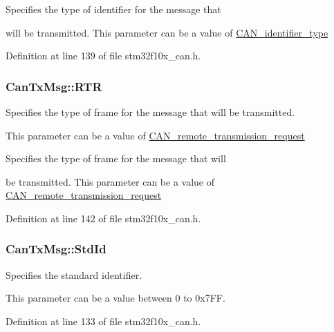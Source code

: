 \begin{DoxyVerb}     Specifies the type of identifier for the message that 
\end{DoxyVerb}
 will be transmitted. This parameter can be a value of \hyperlink{group___c_a_n__identifier__type}{C\-A\-N\-\_\-identifier\-\_\-type} 

Definition at line 139 of file stm32f10x\-\_\-can.\-h.

\hypertarget{struct_can_tx_msg_a69f84255db38c6910058f290efdb7302}{
\subsubsection[{R\-T\-R}]{ Can\-Tx\-Msg\-::\-R\-T\-R}}\label{struct_can_tx_msg_a69f84255db38c6910058f290efdb7302}
\begin{DoxyVerb}     Specifies the type of frame for the message that will be transmitted.
\end{DoxyVerb}
 This parameter can be a value of \hyperlink{group___c_a_n__remote__transmission__request}{C\-A\-N\-\_\-remote\-\_\-transmission\-\_\-request}

\begin{DoxyVerb}     Specifies the type of frame for the message that will 
\end{DoxyVerb}
 be transmitted. This parameter can be a value of \hyperlink{group___c_a_n__remote__transmission__request}{C\-A\-N\-\_\-remote\-\_\-transmission\-\_\-request} 

Definition at line 142 of file stm32f10x\-\_\-can.\-h.

\hypertarget{struct_can_tx_msg_abfb50c8208227f8cf378f29cf9a3a6f3}{
\subsubsection[{Std\-Id}]{ Can\-Tx\-Msg\-::\-Std\-Id}}\label{struct_can_tx_msg_abfb50c8208227f8cf378f29cf9a3a6f3}
\begin{DoxyVerb}  Specifies the standard identifier.
\end{DoxyVerb}
 This parameter can be a value between 0 to 0x7\-F\-F. 

Definition at line 133 of file stm32f10x\-\_\-can.\-h.



